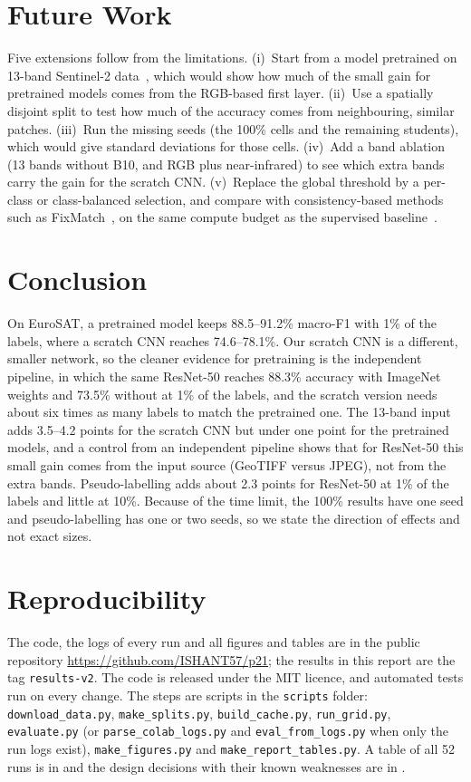 \documentclass[twoside,a4paper,11pt]{article}
\begin{document}
\section{Future Work}\label{sec:future}
Five extensions follow from the limitations. (i)~Start from a model pretrained on 13-band Sentinel-2 data~\cite{wang2023ssl4eo,cong2022satmae}, which would show how much of the small gain for pretrained models comes from the RGB-based first layer. (ii)~Use a spatially disjoint split to test how much of the accuracy comes from neighbouring, similar patches. (iii)~Run the missing seeds (the 100\% cells and the remaining students), which would give standard deviations for those cells. (iv)~Add a band ablation (13 bands without B10, and RGB plus near-infrared) to see which extra bands carry the gain for the scratch CNN. (v)~Replace the global threshold by a per-class or class-balanced selection, and compare with consistency-based methods such as FixMatch~\cite{sohn2020fixmatch}, on the same compute budget as the supervised baseline~\cite{oliver2018realistic}.

\section{Conclusion}
On EuroSAT, a pretrained model keeps 88.5--91.2\% macro-F1 with 1\% of the labels, where a scratch CNN reaches 74.6--78.1\%. Our scratch CNN is a different, smaller network, so the cleaner evidence for pretraining is the independent pipeline, in which the same ResNet-50 reaches 88.3\% accuracy with ImageNet weights and 73.5\% without at 1\% of the labels, and the scratch version needs about six times as many labels to match the pretrained one. The 13-band input adds 3.5--4.2 points for the scratch CNN but under one point for the pretrained models, and a control from an independent pipeline shows that for ResNet-50 this small gain comes from the input source (GeoTIFF versus JPEG), not from the extra bands. Pseudo-labelling adds about 2.3 points for ResNet-50 at 1\% of the labels and little at 10\%. Because of the time limit, the 100\% results have one seed and pseudo-labelling has one or two seeds, so we state the direction of effects and not exact sizes.

\section{Reproducibility}\label{sec:repro}
The code, the logs of every run and all figures and tables are in the public repository \url{https://github.com/ISHANT57/p21}; the results in this report are the tag \texttt{results-v2}. The code is released under the MIT licence, and automated tests run on every change. The steps are scripts in the \texttt{scripts} folder: \texttt{download\_data.py}, \texttt{make\_splits.py}, \texttt{build\_cache.py}, \texttt{run\_grid.py}, \texttt{evaluate.py} (or \texttt{parse\_colab\_logs.py} and \texttt{eval\_from\_logs.py} when only the run logs exist), \texttt{make\_figures.py} and \texttt{make\_report\_tables.py}. A table of all 52 runs is in  and the design decisions with their known weaknesses are in .
\end{document}
